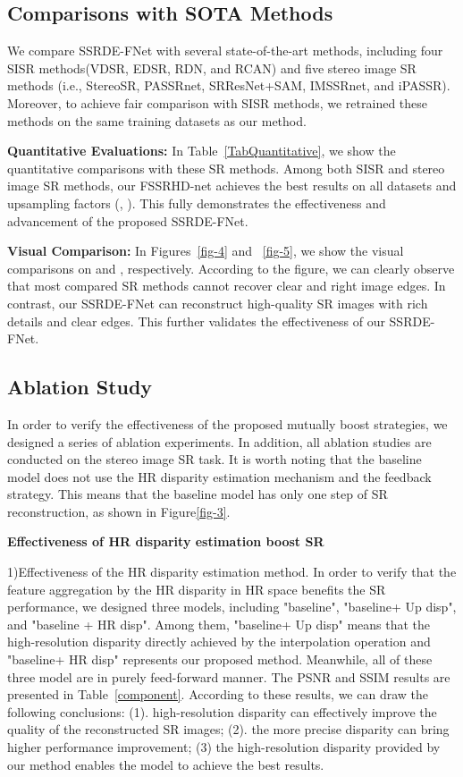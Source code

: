 \documentclass[sigconf]{acmart}
\begin{document}
\subsection{Comparisons with SOTA Methods}
We compare SSRDE-FNet with several state-of-the-art methods, including four SISR methods(VDSR, EDSR, RDN, and RCAN) and five stereo image SR methods (i.e., StereoSR, PASSRnet, SRResNet+SAM, IMSSRnet, and iPASSR). Moreover, to achieve fair comparison with SISR methods, we retrained these methods on the same training datasets as our method.

\textbf{Quantitative Evaluations:}
In Table~\ref{TabQuantitative}, we show the
quantitative comparisons with these SR methods. Among both SISR and stereo image SR methods, our FSSRHD-net achieves the best results on all datasets and upsampling factors (, ). This fully demonstrates the effectiveness and advancement of the proposed SSRDE-FNet.

\textbf{Visual Comparison:}
In Figures~\ref{fig-4} and ~\ref{fig-5}, we show the visual comparisons on  and , respectively. According to the figure, we can clearly observe that
most compared SR methods cannot recover clear and right image edges. In contrast, our SSRDE-FNet can reconstruct high-quality SR images with rich details and clear edges. This further validates the effectiveness of our SSRDE-FNet.


\subsection{Ablation Study}
In order to verify the effectiveness of the proposed mutually boost strategies, we designed a series of ablation experiments. In addition, all ablation studies are conducted on the  stereo image SR task. It is worth noting that the baseline model does not use the HR disparity estimation mechanism and the feedback strategy. This means that the baseline model has only one step of SR reconstruction, as shown in Figure\ref{fig-3}. 

\textbf{Effectiveness of HR disparity estimation boost SR}

1)Effectiveness of the HR disparity estimation method. In order to verify that the feature aggregation by the HR disparity in HR space benefits the SR performance, we designed three models, including "baseline", "baseline+ Up disp", and "baseline + HR disp". Among them, "baseline+ Up disp" means that the high-resolution disparity directly achieved by the interpolation operation and "baseline+ HR disp" represents our proposed method. Meanwhile, all of these three model are in purely feed-forward manner. The PSNR and SSIM results are presented in Table~\ref{component}. According to these results, we can draw the following conclusions: (1). high-resolution disparity can effectively improve the quality of the reconstructed SR images; (2). the more precise disparity can bring higher performance improvement; (3) the high-resolution disparity provided by our method enables the model to achieve the best results.
\end{document}
